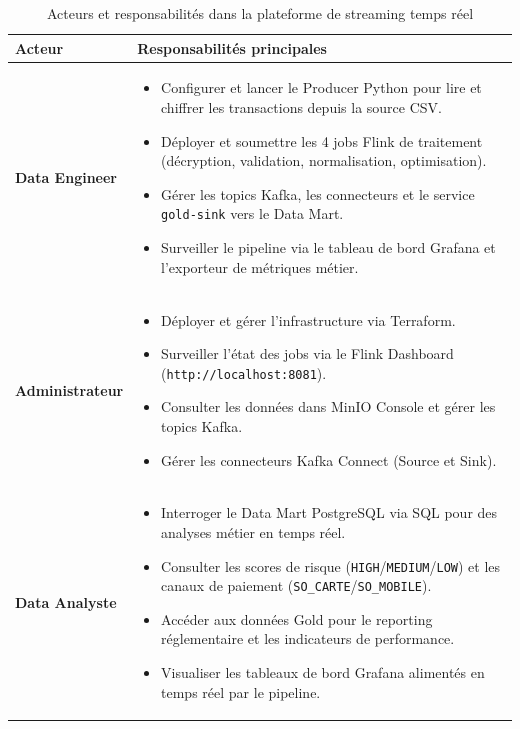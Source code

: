 \begin{table}[H]
\hspace*{-1.1cm}
  \centering
  \renewcommand{\arraystretch}{1.5}
  \begin{tabular}{|l|p{12cm}|}
\hline
\textbf{Acteur} & \textbf{Responsabilités principales} \\
\hline
\textbf{Data Engineer} &
\begin{itemize}
    \item Configurer et lancer le Producer Python pour lire et chiffrer les transactions depuis la source CSV.
    \item Déployer et soumettre les 4 jobs Flink de traitement (décryption, validation, normalisation, optimisation).
    \item Gérer les topics Kafka, les connecteurs et le service \texttt{gold-sink} vers le Data Mart.
    \item Surveiller le pipeline via le tableau de bord Grafana et l'exporteur de métriques métier.
\end{itemize} \\
\hline
\textbf{Administrateur} &
\begin{itemize}
    \item Déployer et gérer l'infrastructure via Terraform.
    \item Surveiller l'état des jobs via le Flink Dashboard (\texttt{http://localhost:8081}).
    \item Consulter les données dans MinIO Console et gérer les topics Kafka.
    \item Gérer les connecteurs Kafka Connect (Source et Sink).
\end{itemize} \\
\hline
\textbf{Data Analyste} &
\begin{itemize}
    \item Interroger le Data Mart PostgreSQL via SQL pour des analyses métier en temps réel.
    \item Consulter les scores de risque (\texttt{HIGH}/\texttt{MEDIUM}/\texttt{LOW}) et les canaux de paiement (\texttt{SO\_CARTE}/\texttt{SO\_MOBILE}).
    \item Accéder aux données Gold pour le reporting réglementaire et les indicateurs de performance.
    \item Visualiser les tableaux de bord Grafana alimentés en temps réel par le pipeline.
\end{itemize} \\
\hline
\end{tabular}
  \caption{Acteurs et responsabilités dans la plateforme de streaming temps réel}
  \label{tab:acteurs}
\end{table}

